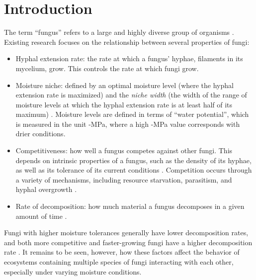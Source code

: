 \documentclass[12pt]{article}
\begin{document}
\clearpage
\pagestyle{fancy}
\setcounter{tocdepth}{2} %
\maketitle
\tableofcontents 
\setcounter{page}{2}

\section{Introduction}

The term ``fungus'' refers to a large and highly diverse group of organisms \cite{fungi}. Existing research focuses on the relationship between several properties of fungi:
\begin{itemize}
\item Hyphal extension rate: the rate at which a fungus' hyphae, filaments in its mycelium, grow. This controls the rate at which fungi grow.
\item Moisture niche: defined by an optimal moisture level (where the hyphal extension rate is maximized) and the \emph{niche width} (the width of the range of moisture levels at which the hyphal extension rate is at least half of its maximum) \cite{trait-based}. Moisture levels are defined in terms of ``water potential'', which is measured in the unit -MPa, where a high -MPa value corresponds with drier conditions.
\item Competitiveness: how well a fungus competes against other fungi. This depends on intrinsic properties of a fungus, such as the density of its hyphae, as well as its tolerance of its current conditions \cite{untangling}. Competition occurs through a variety of mechanisms, including resource starvation, parasitism, and hyphal overgrowth \cite{combat}.
\item Rate of decomposition: how much material a fungus decomposes in a given amount of time \cite{trait-based}.
\end{itemize}
Fungi with higher moisture tolerances generally have lower decomposition rates, and both more competitive and faster-growing fungi have a higher decomposition rate \cite{trait-based}. It remains to be seen, however, how these factors affect the behavior of ecosystems containing multiple species of fungi interacting with each other, especially under varying moisture conditions.
\end{document}
